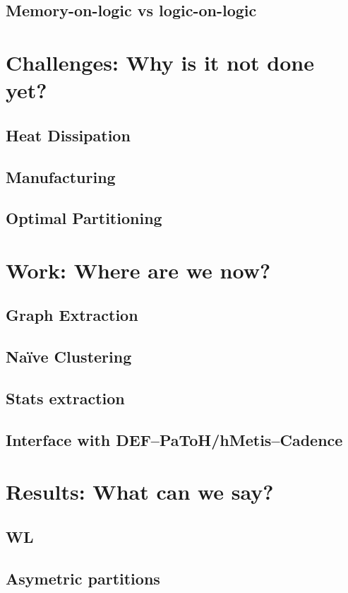 \documentclass[12pt,a4paper]{article}
\theoremstyle{customdef}
\begin{document}
\subsection{Memory-on-logic vs logic-on-logic}


\section{Challenges: Why is it not done yet?}
\subsection{Heat Dissipation}
\subsection{Manufacturing}
\subsection{Optimal Partitioning}


\section{Work: Where are we now?}
\subsection{Graph Extraction}
\subsection{Naïve Clustering}
\subsection{Stats extraction}
\subsection{Interface with DEF--PaToH/hMetis--Cadence}


\section{Results: What can we say?}
\subsection{WL}
\subsection{Asymetric partitions}
\end{document}
